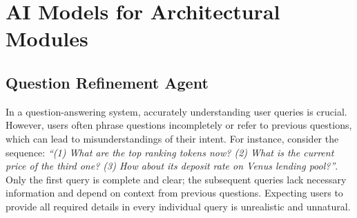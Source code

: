 \documentclass[runningheads]{llncs}
\begin{document}

\section{AI Models for Architectural Modules}
\label{sec:ai_model}

\subsection{Question Refinement Agent}
\label{section:5.1}

In a question-answering system, accurately understanding user queries is crucial. However, users often phrase questions incompletely or refer to previous questions, which can lead to misunderstandings of their intent. For instance, consider the sequence: \textit{``(1) What are the top ranking tokens now? (2) What is the current price of the third one? (3) How about its deposit rate on Venus lending pool?''}. Only the first query is complete and clear; the subsequent queries lack necessary information and depend on context from previous questions. Expecting users to provide all required details in every individual query is unrealistic and unnatural.
\end{document}
